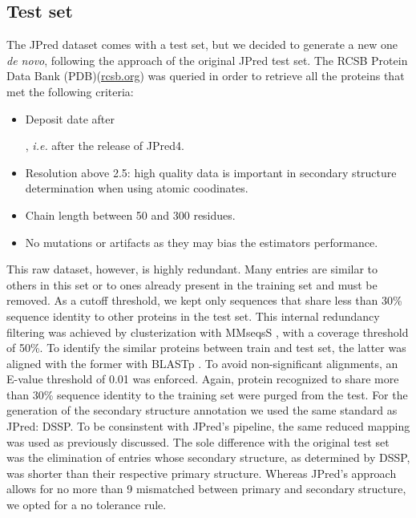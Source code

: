 \documentclass[nocrop]{bioinfo}
\begin{document}
\begin{methods}
\subsection{Test set}
The JPred dataset comes with a test set, but we decided to generate a new one \textit{de novo}, following the approach of the original JPred test set. 
The RCSB Protein Data Bank (PDB)(\href{rcsb.org}{rcsb.org}) \citep{Berman2000} was queried in order to retrieve all the proteins that met the following criteria:
\begin{itemize}
	\item Deposit date after \date{Jan, 2015}, \textit{i.e.} after the release of JPred4.
	\item Resolution above 2.5\SIUnitSymbolAngstrom: high quality data is important in secondary structure determination when using atomic coodinates. 
	\item Chain length between 50 and 300 residues.
	\item No mutations or artifacts as they may bias the estimators performance.
\end{itemize}
This raw dataset, however, is highly redundant.
Many entries are similar to others in this set or to ones already present in the training set and must be removed.
As a cutoff threshold, we kept only sequences that share less than 30\% sequence identity to other proteins in the test set.
This internal redundancy filtering was achieved by clusterization with MMseqsS \citep{Steinegger2017, Steinegger2018}, with a coverage threshold of 50\%.
To identify the similar proteins between train and test set, the latter was aligned with the former with BLASTp \citep{Altschul1990}. 
To avoid non-significant alignments, an E-value threshold of 0.01 was enforced.
Again, protein recognized to share more than 30\% sequence identity to the training set were purged from the test.
For the generation of the secondary structure annotation we used the same standard as JPred: DSSP.
To be consinstent with JPred's pipeline, the same reduced mapping was used as previously discussed.
The sole difference with the original test set was the elimination of entries whose secondary structure, as determined by DSSP, was shorter than their respective primary structure.
Whereas JPred's approach allows for no more than 9 mismatched between primary and secondary structure, we opted for a no tolerance rule.
 

\end{methods}
\end{document}
